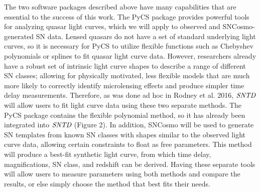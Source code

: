 The two software packages described above have many capabilities
that are essential to the success of this work. The PyCS package
provides powerful tools for analyzing quasar light curves, which we
will apply to observed and SNCosmo-generated SN data. Lensed quasars
do not have a set of standard underlying light curves, so it is
necessary for PyCS to utilize flexible functions such as Chebyshev
polynomials or splines to fit quasar light curve data. However,
researchers already have a robust set of intrinsic light curve shapes
to describe a range of different SN classes; allowing for physically
motivated, less flexible models that are much more likely to correctly
identify microlensing effects and produce simpler time delay
measurements. Therefore, as was done ad hoc in Rodney et al. 2016,
$\textit{SNTD}$ will allow users to fit light curve data using these
two separate methods. The PyCS package contains the flexible
polynomial method, so it has already been integrated into
$\textit{SNTD}$ (Figure 2). In addition, SNCosmo will be used to
generate SN templates from known SN classes with shapes similar to the
observed light curve data, allowing certain constraints to float as
free parameters. This method will produce a best-fit synthetic light
curve, from which time delay, magnifications, SN class, and redshift
can be derived. Having these separate tools will allow users to
measure parameters using both methods and compare the results, or else
simply choose the method that best fits their needs.


